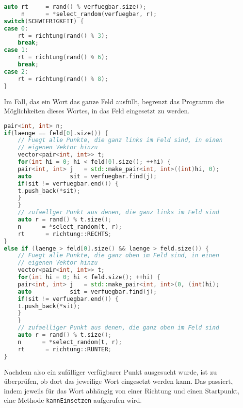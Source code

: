 \documentclass[a4paper,10pt,ngerman]{scrartcl}
\begin{document}
\begin{lstlisting}[language=C++]
auto rt     = rand() % verfuegbar.size();
     n      = *select_random(verfuegbar, r);
switch(SCHWIERIGKEIT) {
case 0:
    rt = richtung(rand() % 3);
    break;
case 1:
    rt = richtung(rand() % 6);
    break;
case 2:
    rt = richtung(rand() % 8);
}
\end{lstlisting}

Im Fall, das ein Wort das ganze Feld ausfüllt, begrenzt das Programm die Möglichkeiten dieses Wortes, in das Feld eingesetzt zu werden.

\begin{lstlisting}[language=C++]
pair<int, int> n;
if(laenge == feld[0].size()) {
	// Fuegt alle Punkte, die ganz links im Feld sind, in einen
	// eigenen Vektor hinzu
	vector<pair<int, int>> t;
	for(int hi = 0; hi < feld[0].size(); ++hi) {
	pair<int, int> j   = std::make_pair<int, int>((int)hi, 0);
	auto           sit = verfuegbar.find(j);
	if(sit != verfuegbar.end()) {
	t.push_back(*sit);
	}
	}
	// zufaellger Punkt aus denen, die ganz links im Feld sind
	auto r = rand() % t.size();
	n      = *select_random(t, r);
	rt      = richtung::RECHTS;
}
else if (laenge > feld[0].size() && laenge > feld.size()) {
	// Fuegt alle Punkte, die ganz oben im Feld sind, in einen
	// eigenen Vektor hinzu
	vector<pair<int, int>> t;
	for(int hi = 0; hi < feld.size(); ++hi) {
	pair<int, int> j   = std::make_pair<int, int>(0, (int)hi);
	auto           sit = verfuegbar.find(j);
	if(sit != verfuegbar.end()) {
	t.push_back(*sit);
	}
	}
	// zufaelliger Punkt aus denen, die ganz oben im Feld sind
	auto r = rand() % t.size();
	n      = *select_random(t, r);
	rt      = richtung::RUNTER;
}
\end{lstlisting}

Nachdem also ein zufälliger verfügbarer Punkt ausgesucht wurde, ist zu überprüfen, ob dort das jeweilige Wort 
eingesetzt werden kann. Das passiert, indem jeweils für das Wort abhängig von einer Richtung und einen 
Startpunkt, eine Methode \lstinline{kannEinsetzen} aufgerufen wird.
\end{document}
